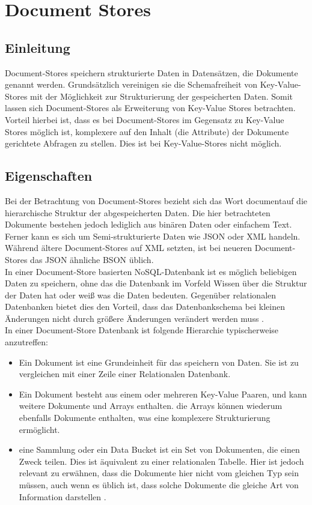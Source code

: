\section{Document Stores}
\subsection{Einleitung}
Document-Stores speichern strukturierte Daten in Datensätzen, die Dokumente genannt werden. Grundsätzlich vereinigen sie die Schemafreiheit von Key-Value-Stores mit der Möglichkeit zur Strukturierung der gespeicherten Daten. Somit lassen sich Document-Stores als Erweiterung von Key-Value Stores betrachten. Vorteil hierbei ist, dass es bei Document-Stores im Gegensatz zu Key-Value Stores möglich ist, komplexere auf den Inhalt (die Attribute) der Dokumente gerichtete Abfragen zu stellen. Dies ist bei Key-Value-Stores nicht möglich.

\subsection{Eigenschaften}
Bei der Betrachtung von Document-Stores bezieht sich das Wort \grqq document\grqq auf die hierarchische Struktur der abgespeicherten Daten. Die hier betrachteten Dokumente bestehen jedoch lediglich aus binären Daten oder einfachem Text. Ferner kann es sich um Semi-strukturierte Daten wie JSON oder XML handeln. Während ältere Document-Stores auf XML setzten, ist bei neueren Document-Stores das JSON ähnliche BSON üblich. 
\\

In einer Document-Store basierten NoSQL-Datenbank ist es möglich beliebigen Daten zu speichern, ohne das die Datenbank im Vorfeld Wissen über die Struktur der Daten hat oder weiß was die Daten bedeuten. Gegenüber relationalen Datenbanken bietet dies den Vorteil, dass das Datenbankschema bei kleinen Änderungen nicht durch gr\"o\ss{}ere \"Anderungen ver\"andert werden muss \cite{harrison01}. \\

In einer Document-Store Datenbank ist folgende Hierarchie typischerweise anzutreffen:
\begin{itemize}
\item Ein Dokument ist eine Grundeinheit für das speichern von Daten. Sie ist zu vergleichen mit einer Zeile einer Relationalen Datenbank.
\item Ein Dokument besteht aus einem oder mehreren Key-Value Paaren, und kann weitere Dokumente und Arrays enthalten. die Arrays können wiederum ebenfalls Dokumente enthalten, was eine komplexere Strukturierung ermöglicht.
\item eine Sammlung oder ein Data Bucket ist ein Set von Dokumenten, die einen Zweck teilen. Dies ist äquivalent zu einer relationalen Tabelle. Hier ist jedoch relevant zu erwähnen, dass die Dokumente hier nicht vom gleichen Typ sein müssen, auch wenn es üblich ist, dass solche Dokumente die gleiche Art von Information darstellen \cite{harrison01}.
\end{itemize}

